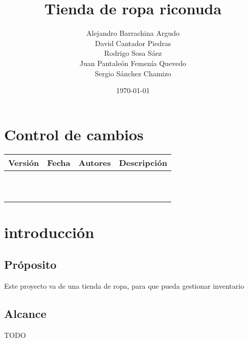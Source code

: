 \documentclass{article}
\title{Tienda de ropa riconuda}
\author{Alejandro Barrachina Argudo \\
David Cantador Piedras \\
Rodrigo Sosa Sáez \\
Juan Pantaleón Femenía Quevedo \\
Sergio Sánchez Chamizo  \\
}
\date{\today}
\begin{document}
\maketitle
\section*{Control de cambios} %
\noindent\begin{tabularx}{\textwidth}{ |l|l|p{5cm}|X| }
    \hline
    \textbf{Versión} & \textbf{Fecha} & \textbf{Autores} & \textbf{Descripción} \\
    \hline
                     &                &                  &                      \\
    \hline
                     &                &                  &                      \\
    \hline
                     &                &                  &                      \\
    \hline
                     &                &                  &                      \\
    \hline
                     &                &                  &                      \\
    \hline
                     &                &                  &                      \\
    \hline
                     &                &                  &                      \\
    \hline
                     &                &                  &                      \\
    \hline
                     &                &                  &                      \\
    \hline
                     &                &                  &                      \\
    \hline
\end{tabularx}


\section{introducción}
\subsection{Próposito}
Este proyecto va de una tienda de ropa, para que pueda gestionar inventario
\subsection{Alcance}
TODO
\end{document}
